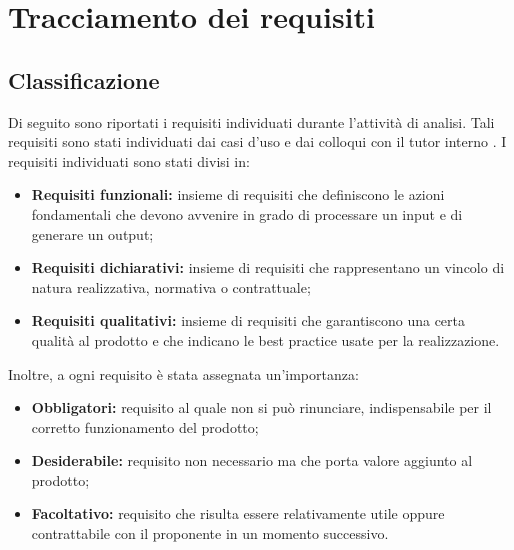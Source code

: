 \section{Tracciamento dei requisiti}

\setcounter{rowcount}{0}
\setcounter{subCount}{0}

\subsection{Classificazione}\label{subsec:classificazione}
Di seguito sono riportati i requisiti individuati durante l'attività di analisi.
Tali requisiti sono stati individuati dai casi d'uso e dai colloqui con il tutor interno \tutorAziendale.
I requisiti individuati sono stati divisi in:
\begin{itemize}
    \item \textbf{Requisiti funzionali:} insieme di requisiti che definiscono le azioni fondamentali che devono avvenire in grado di processare un input e di generare un output;
    \item \textbf{Requisiti dichiarativi:} insieme di requisiti che rappresentano un vincolo di natura realizzativa, normativa o contrattuale;
    \item \textbf{Requisiti qualitativi:} insieme di requisiti che garantiscono una certa qualità al prodotto e che indicano le best practice usate per la realizzazione.
\end{itemize}
Inoltre, a ogni requisito è stata assegnata un'importanza:
\begin{itemize}
    \item \textbf{Obbligatori:} requisito al quale non si può rinunciare, indispensabile per il corretto funzionamento del prodotto;
    \item \textbf{Desiderabile:} requisito non necessario ma che porta valore aggiunto al prodotto;
    \item \textbf{Facoltativo:} requisito che risulta essere relativamente utile oppure contrattabile con il proponente in un momento successivo.
\end{itemize}

